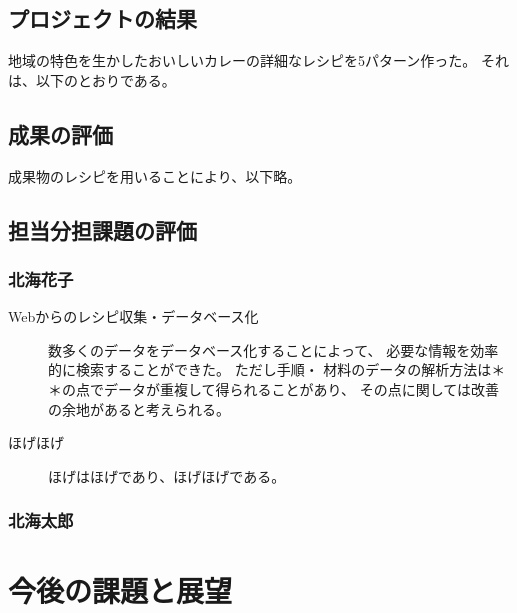 \documentclass[openany,11pt,papersize]{jsbook}
\begin{document}
\section{プロジェクトの結果}

地域の特色を生かしたおいしいカレーの詳細なレシピを5パターン作った。 
それは、以下のとおりである。


\section{成果の評価}

成果物のレシピを用いることにより、以下略。




\section{担当分担課題の評価}

\subsection{北海花子}
\begin{description}
 \item[Webからのレシピ収集・データベース化] 
  数多くのデータをデータベース化することによって、
  必要な情報を効率的に検索することができた。 ただし手順・
  材料のデータの解析方法は＊＊の点でデータが重複して得られることがあり、
  その点に関しては改善の余地があると考えられる。 
 \item[ほげほげ]
  ほげはほげであり、ほげほげである。
\end{description}


\subsection{北海太郎}




\chapter{今後の課題と展望}
\end{document}
